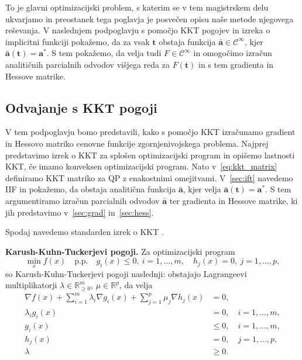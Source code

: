\documentclass[mat2, tisk]{fmfdelo}
\newcommand{\aimplicit}{\bar{\mathbf{a}}}
\newcommand{\tvec}{\mathbf{t}}
\begin{document}
To je glavni optimizacijski problem, s katerim se v tem magistrskem delu ukvarjamo in preostanek tega poglavja je posvečen opisu naše metode njegovega reševanja. V naslednjem podpoglavju s pomočjo KKT pogojev in izreka o implicitni funkciji pokažemo, da za vsak $\tvec$ obstaja funkcija $\aimplicit \in \mathcal{C}^\infty$, kjer $\aimplicit(\tvec) = \mathbf{a}^*$. S tem pokažemo, da velja tudi $F \in \mathcal{C}^\infty$ in omogočimo izračun analitičnih parcialnih odvodov višjega reda za $F(\mathbf{t})$ in s tem gradienta in Hessove matrike.


\subsection{Odvajanje s \acs{KKT} pogoji}

V tem podpoglavju bomo predstavili, kako s pomočjo \ac{KKT} izračunamo gradient in Hessovo matriko cenovne funkcije zgornjenivojskega problema. Najprej predstavimo izrek o \ac{KKT} za splošen optimizacijski program in opišemo lastnosti \ac{KKT}, če imamo konveksen optimizacijski program. Nato v~\ref{eq:kkt_matrix} definiramo \acs{KKT} matriko za \ac{QP} z enakostnimi omejitvami. V~\ref{sec:ift} navedemo \acl{IIF} in pokažemo, da obstaja analitična funkcija $\aimplicit$, kjer velja $\aimplicit(\tvec) = \mathbf{a}^*$. S tem argumentiramo izračun parcialnih odvodov $\aimplicit$ ter gradienta in Hessove matrike, ki jih predstavimo v~\ref{sec:grad} in~\ref{sec:hess}.

Spodaj navedemo standarden izrek o \ac{KKT} \cite{bertsekas1997nonlinear}.

\textbf{Karush-Kuhn-Tuckerjevi pogoji.} Za optimizacijski program
\[
\min_x f(x) \quad \text{p.p.} \quad g_i(x) \leq 0, \ i=1,\dots,m, \quad h_j(x) = 0, \ j=1,\dots,p,
\]
so Karush-Kuhn-Tuckerjevi pogoji naslednji: obstajajo Lagrangeevi multiplikatorji $\lambda \in \mathbb{R}^m_{\geq 0}$, $\mu \in \mathbb{R}^p$, da velja
\begin{align}
\nabla f(x) + \sum_{i=1}^m \lambda_i \nabla g_i(x) + \sum_{j=1}^p \mu_j \nabla h_j(x) &= 0, \label{eq:kkt-stationarity} \\
\lambda_i g_i(x) &= 0, \quad i=1,\dots,m, \label{eq:kkt-complementarity} \\
g_i(x) &\leq 0, \quad i=1,\dots,m, \label{eq:kkt-primal-feasibility} \\
h_j(x) &= 0, \quad j=1,\dots,p, \label{eq:kkt-equality} \\
\lambda &\geq 0. \label{eq:kkt-dual-feasibility}
\end{align}
\end{document}

